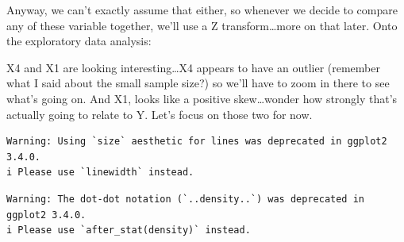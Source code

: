 \documentclass[
  letterpaper,
  DIV=11,
  numbers=noendperiod]{scrartcl}
\newenvironment{Shaded}{\begin{snugshade}}{\end{snugshade}}
\newcommand{\AttributeTok}[1]{\textcolor[rgb]{0.40,0.45,0.13}{#1}}
\newcommand{\DecValTok}[1]{\textcolor[rgb]{0.68,0.00,0.00}{#1}}
\newcommand{\FloatTok}[1]{\textcolor[rgb]{0.68,0.00,0.00}{#1}}
\newcommand{\FunctionTok}[1]{\textcolor[rgb]{0.28,0.35,0.67}{#1}}
\newcommand{\NormalTok}[1]{\textcolor[rgb]{0.00,0.23,0.31}{#1}}
\newcommand{\SpecialCharTok}[1]{\textcolor[rgb]{0.37,0.37,0.37}{#1}}
\newcommand{\StringTok}[1]{\textcolor[rgb]{0.13,0.47,0.30}{#1}}
\begin{document}
Anyway, we can't exactly assume that either, so whenever we decide to
compare any of these variable together, we'll use a Z
transform\ldots more on that later. Onto the exploratory data analysis:

X4 and X1 are looking interesting\ldots X4 appears to have an outlier
(remember what I said about the small sample size?) so we'll have to
zoom in there to see what's going on. And X1, looks like a positive
skew\ldots wonder how strongly that's actually going to relate to Y.
Let's focus on those two for now.

\begin{Shaded}
\end{Shaded}

\begin{verbatim}
Warning: Using `size` aesthetic for lines was deprecated in ggplot2 3.4.0.
i Please use `linewidth` instead.
\end{verbatim}

\begin{verbatim}
Warning: The dot-dot notation (`..density..`) was deprecated in ggplot2 3.4.0.
i Please use `after_stat(density)` instead.
\end{verbatim}
\end{document}

